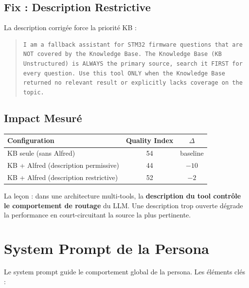 \documentclass[12pt,a4paper]{report}
\begin{document}
\subsection{Fix : Description Restrictive}

La description corrigée force la priorité KB :

\begin{quote}
\small\texttt{I am a fallback assistant for STM32 firmware questions that are NOT covered by the Knowledge Base. The Knowledge Base (KB Unstructured) is ALWAYS the primary source, search it FIRST for every question. Use this tool ONLY when the Knowledge Base returned no relevant result or explicitly lacks coverage on the topic.}
\end{quote}

\subsection{Impact Mesuré}

\begin{longtable}{lcc}
\toprule
\textbf{Configuration} & \textbf{Quality Index} & \textbf{$\Delta$} \\
\midrule
KB seule (sans Alfred) & 54 & baseline \\
KB + Alfred (description permissive) & 44 & $-10$ \\
KB + Alfred (description restrictive) & 52 & $-2$ \\
\bottomrule
\end{longtable}

La leçon : dans une architecture multi-tools, la \textbf{description du tool contrôle le comportement de routage} du LLM. Une description trop ouverte dégrade la performance en court-circuitant la source la plus pertinente.

\section{System Prompt de la Persona}

Le system prompt guide le comportement global de la persona. Les éléments clés :
\end{document}
